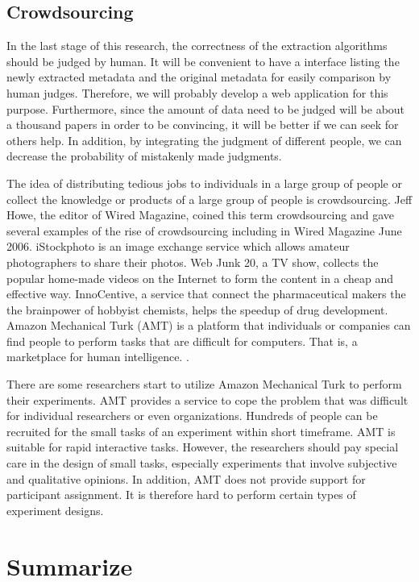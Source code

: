 \documentclass[prodmode]{acmsmall} %
\begin{document}
\subsection{Crowdsourcing}

In the last stage of this research, the correctness of the extraction algorithms should be judged by human. It will be convenient to have a interface listing the newly extracted metadata and the original metadata for easily comparison by human judges. Therefore, we will probably develop a web application for this purpose. Furthermore, since the amount of data need to be judged will be about a thousand papers in order to be convincing, it will be better if we can seek for others help. In addition, by integrating the judgment of different people, we can decrease the probability of mistakenly made judgments.

The idea of distributing tedious jobs to individuals in a large group of people or collect the knowledge or products of a large group of people is crowdsourcing. Jeff Howe, the editor of Wired Magazine, coined this term crowdsourcing and gave several examples of the rise of crowdsourcing including in Wired Magazine June 2006. iStockphoto is an image exchange service which allows amateur photographers to share their photos. Web Junk 20, a TV show, collects the popular home-made videos on the Internet to form the content in a cheap and effective way. InnoCentive, a service that connect the pharmaceutical makers the the brainpower of hobbyist chemists, helps the speedup of drug development. Amazon Mechanical Turk (AMT) is a platform that individuals or companies can find people to perform tasks that are difficult for computers. That is, a marketplace for human intelligence. \cite{Howe2006}.

There are some researchers start to utilize Amazon Mechanical Turk to perform their experiments. AMT provides a service to cope the problem that was difficult for individual researchers or even organizations. Hundreds of people can be recruited for the small tasks of an experiment within short timeframe. AMT is suitable for rapid interactive tasks. However, the researchers should pay special care in the design of small tasks, especially experiments that involve subjective and qualitative opinions. In addition, AMT does not provide support for participant assignment. It is therefore hard to perform certain types of experiment designs. \cite{Kittur2008}

\section{Summarize}





\end{document}
